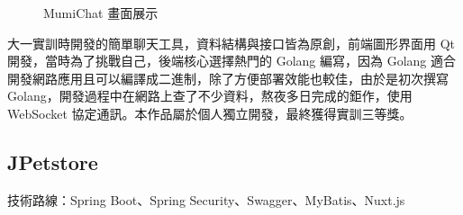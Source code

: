 \documentclass[classical]{einfart}
\begin{document}
\begin{figure}[H]
    \centering
    \caption{MumiChat 畫面展示}
\end{figure}

大一實訓時開發的簡單聊天工具，資料結構與接口皆為原創，前端圖形界面用 Qt
開發，當時為了挑戰自己，後端核心選擇熱門的 Golang 編寫，因為 Golang
適合開發網路應用且可以編譯成二進制，除了方便部署效能也較佳，由於是初次撰寫
Golang，開發過程中在網路上查了不少資料，熬夜多日完成的鉅作，使用
WebSocket 協定通訊。本作品屬於個人獨立開發，最終獲得實訓三等獎。

\subsection{JPetstore}

技術路線：Spring Boot、Spring Security、Swagger、MyBatis、Nuxt.js
\end{document}
